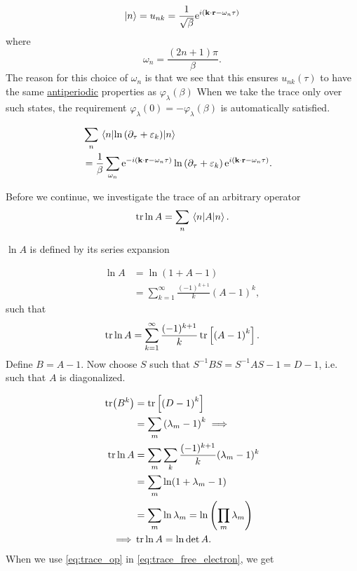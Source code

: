 \begin{equation}
\ket n = u_{nk} = \frac{1}{\sqrt{\beta}}\mathrm{e}^{i\left(\textbf{k}\cdot\textbf{r} - \omega_n\tau \right)}
\end{equation}
where
\begin{equation}
\omega_n = \frac{\left(2n+1\right)\pi}{\beta}.
\end{equation}
The reason for this choice of $\omega_n$ is that we see that this ensures $u_{nk}(\tau)$ to have the same \underline{antiperiodic} properties as $\varphi_\lambda(\beta)$
When we take the trace only over such states, the requirement \( \varphi_\lambda(0) = -\varphi_\lambda(\beta)\) is automatically satisfied.

\begin{align}
&\sum_n \ev{\ln\left(\partial_\tau + \varepsilon_k\right)}{n} & \nonumber \\
& = \frac{1}{\beta}\sum_{\omega_n}\e^{-i\left(\textbf{k}\cdot \textbf{r} - \omega_n\tau\right)}\ln\left(\partial_\tau + \varepsilon_k\right)\e^{i\left(\textbf{k}\cdot \textbf{r} - \omega_n\tau\right)}. \label{eq:trace_free_electron}&
\end{align}

Before we continue, we investigate the trace of an arbitrary operator
\begin{equation}
\tr\ln A = \sum_n\ev{A}{n}.
\end{equation}

$\ln A$ is defined by its series expansion

\begin{align}
\ln A &= \ln (1+A-1) \nonumber \\
&= \sum_{k=1}^\infty\frac{(-1)^{k+1}}{k}\left(A-1\right)^k,
\end{align}
such that 
\begin{equation}
\tr\ln A = \sum_{k=1}^\infty\frac{(-1)^{k+1}}{k}\tr\left[\left(A-1\right)^k\right].
\end{equation}
Define $B = A-1$. Now choose $S$ such that $S^{-1}BS = S^{-1}AS -1 = D-1$, i.e. such that $A$ is diagonalized. 

\begin{align}
\tr(B^k) &= \tr\left[\left(D-1\right)^k\right] \nonumber\\
 &= \sum_m \left(\lambda_m -1\right)^k
 \implies\nonumber \\
 \tr\ln A &= \sum_m\sum_k\frac{(-1)^{k+1}}{k}(\lambda_m-1)^k\nonumber \\
 &= \sum_m\ln(1+\lambda_m -1)\nonumber \\
 &= \sum_m \ln\lambda_m = \ln \left(\prod_m\lambda_m\right)\nonumber \\
\implies & \tr\ln A = \ln\det A. \label{eq:trace_op}
\end{align}
When we use \eqref{eq:trace_op} in \eqref{eq:trace_free_electron}, we get

